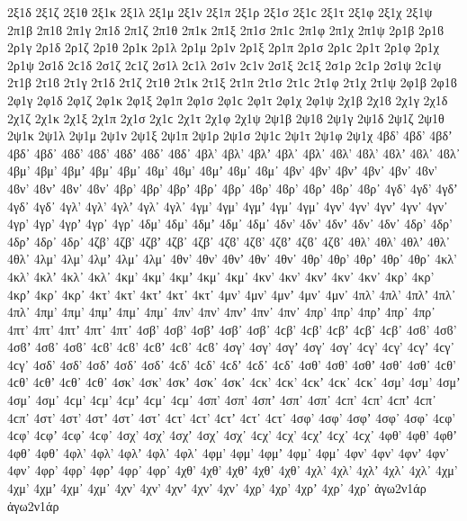 {2ξ1δ
2ξ1ζ
2ξ1θ
2ξ1κ
2ξ1λ
2ξ1μ
2ξ1ν
2ξ1π
2ξ1ρ
2ξ1σ 2ξ1ϲ
2ξ1τ
2ξ1φ
2ξ1χ
2ξ1ψ
%
2π1β 2π1ϐ
2π1γ
2π1δ
2π1ζ
2π1θ
2π1κ
2π1ξ
2π1σ 2π1ϲ
2π1φ
2π1χ
2π1ψ
%
2ρ1β 2ρ1ϐ
2ρ1γ
2ρ1δ
2ρ1ζ
2ρ1θ
2ρ1κ
2ρ1λ
2ρ1μ
2ρ1ν
2ρ1ξ
2ρ1π
2ρ1σ 2ρ1ϲ
2ρ1τ
2ρ1φ
2ρ1χ
2ρ1ψ
%
2σ1δ 2ϲ1δ   %
2σ1ζ 2ϲ1ζ
2σ1λ 2ϲ1λ
2σ1ν 2ϲ1ν
2σ1ξ 2ϲ1ξ
2σ1ρ 2ϲ1ρ
2σ1ψ 2ϲ1ψ
%
2τ1β 2τ1ϐ
2τ1γ
2τ1δ
2τ1ζ
2τ1θ
2τ1κ
2τ1ξ
2τ1π
2τ1σ 2τ1ϲ
2τ1φ
2τ1χ
2τ1ψ
%
2φ1β 2φ1ϐ
2φ1γ
2φ1δ
2φ1ζ
2φ1κ
2φ1ξ
2φ1π
2φ1σ 2φ1ϲ
2φ1τ
2φ1χ
2φ1ψ
%
2χ1β 2χ1ϐ
2χ1γ
2χ1δ
2χ1ζ
2χ1κ
2χ1ξ
2χ1π
2χ1σ 2χ1ϲ
2χ1τ
2χ1φ
2χ1ψ
%
2ψ1β 2ψ1ϐ
2ψ1γ
2ψ1δ
2ψ1ζ
2ψ1θ
2ψ1κ
2ψ1λ
2ψ1μ
2ψ1ν
2ψ1ξ
2ψ1π
2ψ1ρ
2ψ1σ 2ψ1ϲ
2ψ1τ
2ψ1φ
2ψ1χ
4βδ' 4βδ’ 4βδʼ 4βδ᾽ 4βδ᾿ 4ϐδ' 4ϐδ’ 4ϐδʼ 4ϐδ᾽ 4ϐδ᾿
4βλ' 4βλ’ 4βλʼ 4βλ᾽ 4βλ᾿ 4ϐλ' 4ϐλ’ 4ϐλʼ 4ϐλ᾽ 4ϐλ᾿
4βμ' 4βμ’ 4βμʼ 4βμ᾽ 4βμ᾿ 4ϐμ' 4ϐμ’ 4ϐμʼ 4ϐμ᾽ 4ϐμ᾿
4βν' 4βν’ 4βνʼ 4βν᾽ 4βν᾿ 4ϐν' 4ϐν’ 4ϐνʼ 4ϐν᾽ 4ϐν᾿
4βρ' 4βρ’ 4βρʼ 4βρ᾽ 4βρ᾿ 4ϐρ' 4ϐρ’ 4ϐρʼ 4ϐρ᾽ 4ϐρ᾿
%
4γδ' 4γδ’ 4γδʼ 4γδ᾽ 4γδ᾿
4γλ' 4γλ’ 4γλʼ 4γλ᾽ 4γλ᾿
4γμ' 4γμ’ 4γμʼ 4γμ᾽ 4γμ᾿
4γν' 4γν’ 4γνʼ 4γν᾽ 4γν᾿
4γρ' 4γρ’ 4γρʼ 4γρ᾽ 4γρ᾿
%
4δμ' 4δμ’ 4δμʼ 4δμ᾽ 4δμ᾿
4δν' 4δν’ 4δνʼ 4δν᾽ 4δν᾿
4δρ' 4δρ’ 4δρʼ 4δρ᾽ 4δρ᾿
%
4ζβ' 4ζβ’ 4ζβʼ 4ζβ᾽ 4ζβ᾿ 4ζϐ' 4ζϐ’ 4ζϐʼ 4ζϐ᾽ 4ζϐ᾿
%
4θλ' 4θλ’ 4θλʼ 4θλ᾽ 4θλ᾿
4λμ' 4λμ’ 4λμʼ 4λμ᾽ 4λμ᾿
4θν' 4θν’ 4θνʼ 4θν᾽ 4θν᾿
4θρ' 4θρ’ 4θρʼ 4θρ᾽ 4θρ᾿
%
4κλ' 4κλ’ 4κλʼ 4κλ᾽ 4κλ᾿
4κμ' 4κμ’ 4κμʼ 4κμ᾽ 4κμ᾿
4κν' 4κν’ 4κνʼ 4κν᾽ 4κν᾿
4κρ' 4κρ’ 4κρʼ 4κρ᾽ 4κρ᾿
4κτ' 4κτ’ 4κτʼ 4κτ᾽ 4κτ᾿
%
4μν' 4μν’ 4μνʼ 4μν᾽ 4μν᾿
%
4πλ' 4πλ’ 4πλʼ 4πλ᾽ 4πλ᾿
4πμ' 4πμ’ 4πμʼ 4πμ᾽ 4πμ᾿
4πν' 4πν’ 4πνʼ 4πν᾽ 4πν᾿
4πρ' 4πρ’ 4πρʼ 4πρ᾽ 4πρ᾿
4πτ' 4πτ’ 4πτʼ 4πτ᾽ 4πτ᾿
%
4σβ' 4σβ’ 4σβʼ 4σβ᾽ 4σβ᾿ 4ϲβ' 4ϲβ’ 4ϲβʼ 4ϲβ᾽ 4ϲβ᾿ 4σϐ' 4σϐ’ 4σϐʼ 4σϐ᾽ 4σϐ᾿ 4ϲϐ' 4ϲϐ’ 4ϲϐʼ 4ϲϐ᾽ 4ϲϐ᾿
4σγ' 4σγ’ 4σγʼ 4σγ᾽ 4σγ᾿ 4ϲγ' 4ϲγ’ 4ϲγʼ 4ϲγ᾽ 4ϲγ᾿
4σδ' 4σδ’ 4σδʼ 4σδ᾽ 4σδ᾿ 4ϲδ' 4ϲδ’ 4ϲδʼ 4ϲδ᾽ 4ϲδ᾿
4σθ' 4σθ’ 4σθʼ 4σθ᾽ 4σθ᾿ 4ϲθ' 4ϲθ’ 4ϲθʼ 4ϲθ᾽ 4ϲθ᾿
4σκ' 4σκ’ 4σκʼ 4σκ᾽ 4σκ᾿ 4ϲκ' 4ϲκ’ 4ϲκʼ 4ϲκ᾽ 4ϲκ᾿
4σμ' 4σμ’ 4σμʼ 4σμ᾽ 4σμ᾿ 4ϲμ' 4ϲμ’ 4ϲμʼ 4ϲμ᾽ 4ϲμ᾿
4σπ' 4σπ’ 4σπʼ 4σπ᾽ 4σπ᾿ 4ϲπ' 4ϲπ’ 4ϲπʼ 4ϲπ᾽ 4ϲπ᾿
4στ' 4στ’ 4στʼ 4στ᾽ 4στ᾿ 4ϲτ' 4ϲτ’ 4ϲτʼ 4ϲτ᾽ 4ϲτ᾿
4σφ' 4σφ’ 4σφʼ 4σφ᾽ 4σφ᾿ 4ϲφ' 4ϲφ’ 4ϲφʼ 4ϲφ᾽ 4ϲφ᾿
4σχ' 4σχ’ 4σχʼ 4σχ᾽ 4σχ᾿ 4ϲχ' 4ϲχ’ 4ϲχʼ 4ϲχ᾽ 4ϲχ᾿
%
4φθ' 4φθ’ 4φθʼ 4φθ᾽ 4φθ᾿
4φλ' 4φλ’ 4φλʼ 4φλ᾽ 4φλ᾿
4φμ' 4φμ’ 4φμʼ 4φμ᾽ 4φμ᾿
4φν' 4φν’ 4φνʼ 4φν᾽ 4φν᾿
4φρ' 4φρ’ 4φρʼ 4φρ᾽ 4φρ᾿
%
4χθ' 4χθ’ 4χθʼ 4χθ᾽ 4χθ᾿
4χλ' 4χλ’ 4χλʼ 4χλ᾽ 4χλ᾿
4χμ' 4χμ’ 4χμʼ 4χμ᾽ 4χμ᾿
4χν' 4χν’ 4χνʼ 4χν᾽ 4χν᾿
4χρ' 4χρ’ 4χρʼ 4χρ᾽ 4χρ᾿
%
ἀγω2ν1άρ ἀγω2ν1άρ   %
}
